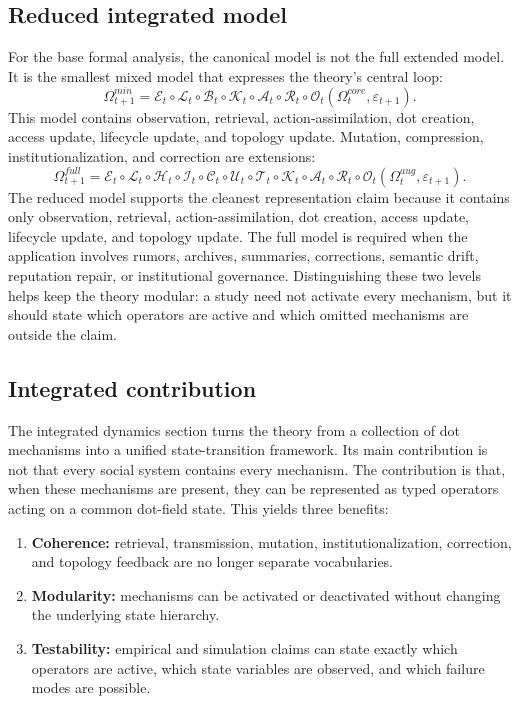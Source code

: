 \documentclass[11pt]{article}
\theoremstyle{remark}
\begin{document}
\subsection{Reduced integrated model}\label{minimal-integrated-model}

For the base formal analysis, the canonical model is not the full extended model. It is the smallest mixed model that expresses the theory's central loop:
\[
\Omega_{t+1}^{min}=\mathscr E_t\circ\mathscr L_t\circ\mathscr B_t\circ\mathscr K_t\circ\mathscr A_t\circ\mathscr R_t\circ\mathscr O_t(\Omega_t^{core},\varepsilon_{t+1}).
\]
This model contains observation, retrieval, action-assimilation, dot creation, access update, lifecycle update, and topology update. Mutation, compression, institutionalization, and correction are extensions:
\[
\Omega_{t+1}^{full}=\mathscr E_t\circ\mathscr L_t\circ\mathscr H_t\circ\mathscr I_t\circ\mathscr C_t\circ\mathscr U_t\circ\mathscr T_t\circ\mathscr K_t\circ\mathscr A_t\circ\mathscr R_t\circ\mathscr O_t(\Omega_t^{aug},\varepsilon_{t+1}).
\]
The reduced model supports the cleanest representation claim because it contains only observation, retrieval, action-assimilation, dot creation, access update, lifecycle update, and topology update. The full model is required when the application involves rumors, archives, summaries, corrections, semantic drift, reputation repair, or institutional governance. Distinguishing these two levels helps keep the theory modular: a study need not activate every mechanism, but it should state which operators are active and which omitted mechanisms are outside the claim.

\subsection{Integrated contribution}\label{integrated-contribution}

The integrated dynamics section turns the theory from a collection of dot mechanisms into a unified state-transition framework. Its main contribution is not that every social system contains every mechanism. The contribution is that, when these mechanisms are present, they can be represented as typed operators acting on a common dot-field state. This yields three benefits:

\begin{enumerate}[leftmargin=*]
\item \textbf{Coherence:} retrieval, transmission, mutation, institutionalization, correction, and topology feedback are no longer separate vocabularies.
\item \textbf{Modularity:} mechanisms can be activated or deactivated without changing the underlying state hierarchy.
\item \textbf{Testability:} empirical and simulation claims can state exactly which operators are active, which state variables are observed, and which failure modes are possible.
\end{enumerate}
\end{document}
